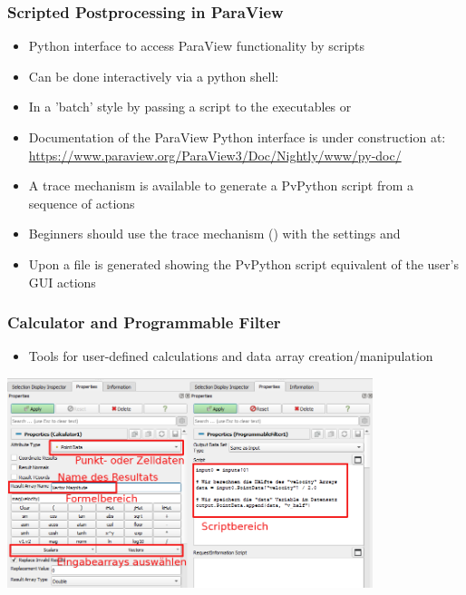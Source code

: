 \begin{frame}

  \frametitle{Scripted Postprocessing in ParaView}

  \begin{itemize}

    \item Python interface to access ParaView functionality by scripts

    \item Can be done interactively via a python shell:  

    \item In a 'batch' style by passing a script to the executables  or  

    \item Documentation of the ParaView Python interface is under construction at:
      \url{https://www.paraview.org/ParaView3/Doc/Nightly/www/py-doc/}

    \item A trace mechanism is available to generate a PvPython script from a sequence of actions

    \item Beginners should use the trace mechanism () with the settings  and  

    \item Upon  a file is generated showing the PvPython script equivalent of the user's GUI actions
  \end{itemize}

\end{frame}

\begin{frame}
  \frametitle{Calculator and Programmable Filter}
    \begin{itemize}
      \item Tools for user-defined calculations and data array creation/manipulation
    \end{itemize}
		\begin{center}
      \includegraphics[width=0.8\textwidth]{screenshots/prog-filter.png}					
		\end{center}
\end{frame}


